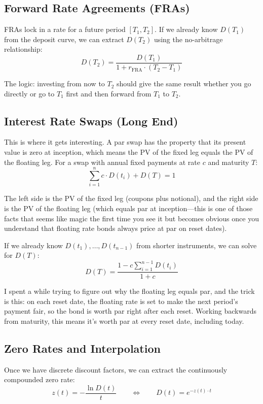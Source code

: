 \documentclass[11pt]{article}
\begin{document}
\subsection{Forward Rate Agreements (FRAs)}

FRAs lock in a rate for a future period $[T_1, T_2]$. If we already know $D(T_1)$ from the deposit curve, we can extract $D(T_2)$ using the no-arbitrage relationship:
\[
D(T_2) = \frac{D(T_1)}{1 + r_{\text{FRA}} \cdot (T_2 - T_1)}
\]

The logic: investing from now to $T_2$ should give the same result whether you go directly or go to $T_1$ first and then forward from $T_1$ to $T_2$.

\subsection{Interest Rate Swaps (Long End)}

This is where it gets interesting. A par swap has the property that its present value is zero at inception, which means the PV of the fixed leg equals the PV of the floating leg. For a swap with annual fixed payments at rate $c$ and maturity $T$:
\[
\sum_{i=1}^{n} c \cdot D(t_i) + D(T) = 1
\]

The left side is the PV of the fixed leg (coupons plus notional), and the right side is the PV of the floating leg (which equals par at inception---this is one of those facts that seems like magic the first time you see it but becomes obvious once you understand that floating rate bonds always price at par on reset dates).

If we already know $D(t_1), \ldots, D(t_{n-1})$ from shorter instruments, we can solve for $D(T)$:
\[
D(T) = \frac{1 - c \sum_{i=1}^{n-1} D(t_i)}{1 + c}
\]

I spent a while trying to figure out why the floating leg equals par, and the trick is this: on each reset date, the floating rate is set to make the next period's payment fair, so the bond is worth par right after each reset. Working backwards from maturity, this means it's worth par at every reset date, including today.

\subsection{Zero Rates and Interpolation}

Once we have discrete discount factors, we can extract the continuously compounded zero rate:
\[
z(t) = -\frac{\ln D(t)}{t} \qquad \Leftrightarrow \qquad D(t) = e^{-z(t) \cdot t}
\]
\end{document}
